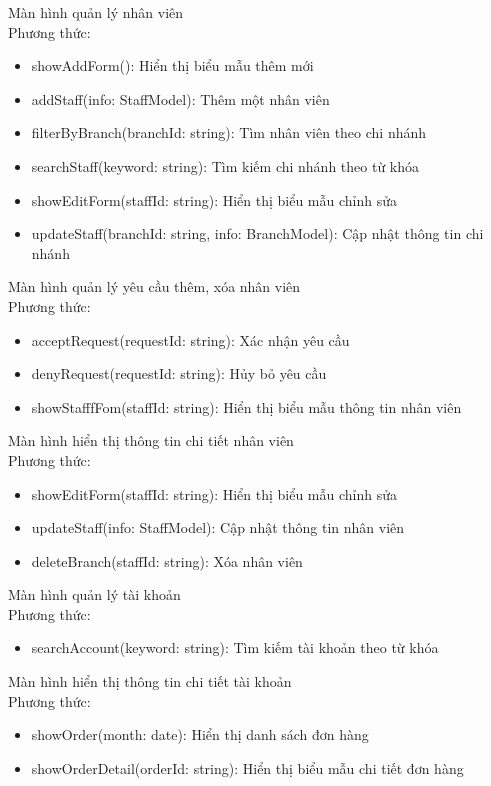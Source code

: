 Màn hình quản lý nhân viên\\
Phương thức:
\begin{itemize}
    \item showAddForm(): Hiển thị biểu mẫu thêm mới
    \item addStaff(info: StaffModel): Thêm một nhân viên
    \item filterByBranch(branchId: string): Tìm nhân viên theo chi nhánh
    \item searchStaff(keyword: string): Tìm kiếm chi nhánh theo từ khóa
    \item showEditForm(staffId: string): Hiển thị biểu mẫu chỉnh sửa
    \item updateStaff(branchId: string, info: BranchModel): Cập nhật thông tin chi nhánh
\end{itemize}
 
Màn hình quản lý yêu cầu thêm, xóa nhân viên\\
Phương thức:
\begin{itemize}
    \item acceptRequest(requestId: string): Xác nhận yêu cầu
    \item denyRequest(requestId: string): Hủy bỏ yêu cầu
    \item showStafffFom(staffId: string): Hiển thị biểu mẫu thông tin nhân viên
\end{itemize}
 
 
Màn hình hiển thị thông tin chi tiết nhân viên\\
Phương thức:
\begin{itemize}
    \item showEditForm(staffId: string): Hiển thị biểu mẫu chỉnh sửa
    \item updateStaff(info: StaffModel): Cập nhật thông tin nhân viên
    \item deleteBranch(staffId: string): Xóa nhân viên
\end{itemize}
 
Màn hình quản lý tài khoản\\
Phương thức:
\begin{itemize}
    \item searchAccount(keyword: string): Tìm kiếm tài khoản theo từ khóa
\end{itemize}
 
 
Màn hình hiển thị thông tin chi tiết tài khoản\\
Phương thức:
\begin{itemize}
    \item showOrder(month: date): Hiển thị danh sách đơn hàng
    \item showOrderDetail(orderId: string): Hiển thị biểu mẫu chi tiết đơn hàng
\end{itemize}
 
